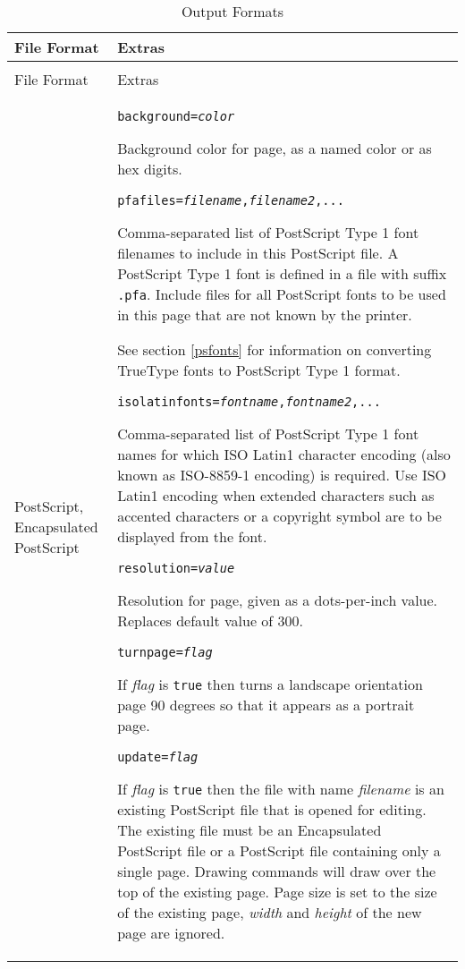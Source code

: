 \begin{longtable}{|p{4cm}|p{10cm}|}
\hline
\label{outputformats}
File Format & Extras \\
\hline
\hline
\endfirsthead
\hline
\caption{Output Formats} \\
\endfoot

\hline
File Format & Extras \\
\hline
\hline
\endhead

PostScript, Encapsulated PostScript &

\texttt{background=\textit{color}}

Background color for page, as a named color or as hex digits.

\vspace{10pt}
\texttt{pfafiles=\textit{filename},\textit{filename2},...}

Comma-separated list of PostScript Type 1 font filenames
to include in this PostScript file.
A PostScript Type 1 font is defined in a file
with suffix \texttt{.pfa}.  Include
files for all PostScript fonts to be used in this
page that are not known by the printer.

See section \ref{psfonts} for
information on converting TrueType fonts to PostScript Type 1 format.

\vspace{10pt}
\texttt{isolatinfonts=\textit{fontname},\textit{fontname2},...}

Comma-separated list of PostScript Type 1 font names for
which ISO Latin1 character encoding
(also known as ISO-8859-1 encoding)
is required.  Use ISO Latin1 encoding
when extended characters such as accented characters
or a copyright symbol are to be displayed from the font.

\vspace{10pt}
\texttt{resolution=\textit{value}}

Resolution for page, given as a dots-per-inch value.  Replaces
default value of 300.

\vspace{10pt}
\texttt{turnpage=\textit{flag}}

If \textit{flag} is \texttt{true} then
turns a landscape orientation page 90 degrees so that it appears
as a portrait page.

\vspace{10pt}
\texttt{update=\textit{flag}}

If \textit{flag} is \texttt{true} then the file with name
\textit{filename} is an existing PostScript 
file that is opened for editing.  The existing file must be an
Encapsulated PostScript file or a PostScript file containing only
a single page.
Drawing commands will draw over the top of the existing page.
Page size is set to the size of the existing page,
\textit{width} and \textit{height} of the new page are ignored.  \\


\end{longtable}

